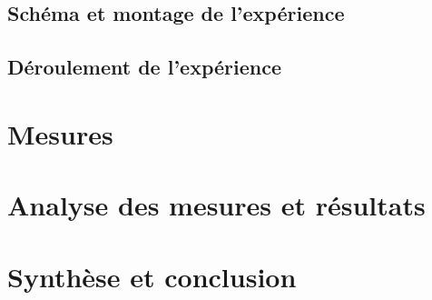 \documentclass[12pt,a4paper]{article}
\begin{document}
    \subsection{Schéma et montage de l’expérience}
    \subsection{Déroulement de l'expérience}

    \section{Mesures}

    \section{Analyse des mesures et résultats}

    \section{Synthèse et conclusion}
\end{document}
